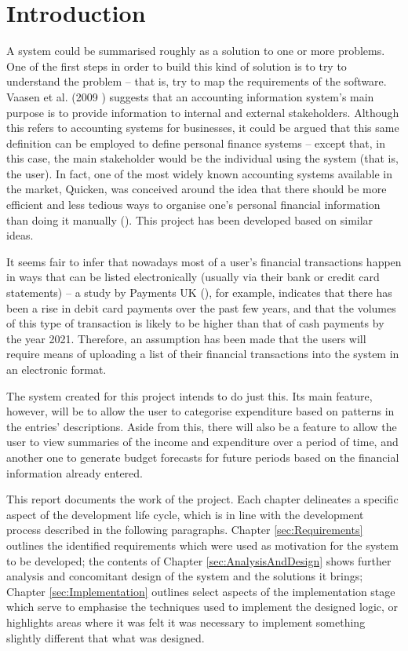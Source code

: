 \section{Introduction} \label{sec:Introduction}

A system could be summarised roughly as a solution to one or more problems. One
of the first steps in order to build this kind of solution is to try to
understand the problem -- that is, try to map the requirements of the software.
Vaasen et al. (2009 \cite[cited][p.~8]{Boczko:2012:IAI:2331376}) suggests that
an accounting information system's main purpose is to provide information to
internal and external stakeholders. Although this refers to accounting systems
for businesses, it could be argued that this same definition can be employed to
define personal finance systems -- except that, in this case, the main
stakeholder would be the individual using the system (that is, the user). In
fact, one of the most widely known accounting systems available in the market,
Quicken\texttrademark, was conceived around the idea that there should be more
efficient and less tedious ways to organise one's personal financial
information than doing it manually (\cite{quicken2017about}). This project has
been developed based on similar ideas.

It seems fair to infer that nowadays most of a user's financial transactions
happen in ways that can be listed electronically (usually via their bank or
credit card statements) -- a study by Payments UK
(\citeyear{paymentsUK2017summary}), for example, indicates that there has been
a rise in debit card payments over the past few years, and that the volumes of
this type of transaction is likely to be higher than that of cash payments by
the year 2021. Therefore, an assumption has been made that the users will
require means of uploading a list of their financial transactions into the
system in an electronic format.

The system created for this project intends to do just this. Its main feature,
however, will be to allow the user to categorise expenditure based on patterns
in the entries' descriptions. Aside from this, there will also be a feature to
allow the user to view summaries of the income and expenditure over a period of
time, and another one to generate budget forecasts for future periods based on
the financial information already entered.

This report documents the work of the project. Each chapter delineates a
specific aspect of the development life cycle, which is in line with the
development process described in the following paragraphs. Chapter
\ref{sec:Requirements} outlines the identified requirements which were used as
motivation for the system to be developed; the contents of Chapter
\ref{sec:AnalysisAndDesign} shows further analysis and concomitant design of
the system and the solutions it brings; Chapter \ref{sec:Implementation}
outlines select aspects of the implementation stage which serve to emphasise
the techniques used to implement the designed logic, or highlights areas where
it was felt it was necessary to implement something slightly different that
what was designed.

